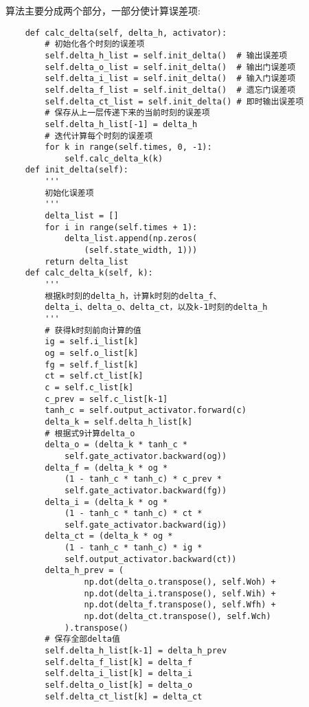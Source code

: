 算法主要分成两个部分，一部分使计算误差项:
\begin{lstlisting}
    def calc_delta(self, delta_h, activator):
        # 初始化各个时刻的误差项
        self.delta_h_list = self.init_delta()  # 输出误差项
        self.delta_o_list = self.init_delta()  # 输出门误差项
        self.delta_i_list = self.init_delta()  # 输入门误差项
        self.delta_f_list = self.init_delta()  # 遗忘门误差项
        self.delta_ct_list = self.init_delta() # 即时输出误差项
        # 保存从上一层传递下来的当前时刻的误差项
        self.delta_h_list[-1] = delta_h
        # 迭代计算每个时刻的误差项
        for k in range(self.times, 0, -1):
            self.calc_delta_k(k)
    def init_delta(self):
        '''
        初始化误差项
        '''
        delta_list = []
        for i in range(self.times + 1):
            delta_list.append(np.zeros(
                (self.state_width, 1)))
        return delta_list
    def calc_delta_k(self, k):
        '''
        根据k时刻的delta_h，计算k时刻的delta_f、
        delta_i、delta_o、delta_ct，以及k-1时刻的delta_h
        '''
        # 获得k时刻前向计算的值
        ig = self.i_list[k]
        og = self.o_list[k]
        fg = self.f_list[k]
        ct = self.ct_list[k]
        c = self.c_list[k]
        c_prev = self.c_list[k-1]
        tanh_c = self.output_activator.forward(c)
        delta_k = self.delta_h_list[k]
        # 根据式9计算delta_o
        delta_o = (delta_k * tanh_c * 
            self.gate_activator.backward(og))
        delta_f = (delta_k * og * 
            (1 - tanh_c * tanh_c) * c_prev *
            self.gate_activator.backward(fg))
        delta_i = (delta_k * og * 
            (1 - tanh_c * tanh_c) * ct *
            self.gate_activator.backward(ig))
        delta_ct = (delta_k * og * 
            (1 - tanh_c * tanh_c) * ig *
            self.output_activator.backward(ct))
        delta_h_prev = (
                np.dot(delta_o.transpose(), self.Woh) +
                np.dot(delta_i.transpose(), self.Wih) +
                np.dot(delta_f.transpose(), self.Wfh) +
                np.dot(delta_ct.transpose(), self.Wch)
            ).transpose()
        # 保存全部delta值
        self.delta_h_list[k-1] = delta_h_prev
        self.delta_f_list[k] = delta_f
        self.delta_i_list[k] = delta_i
        self.delta_o_list[k] = delta_o
        self.delta_ct_list[k] = delta_ct
\end{lstlisting}

